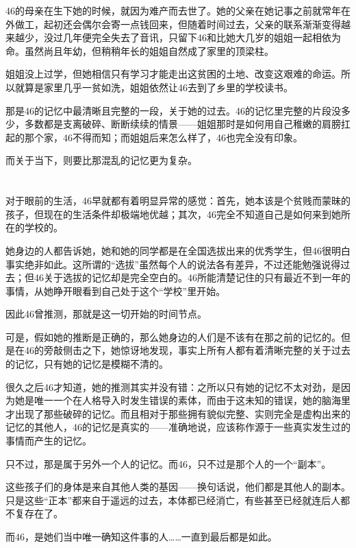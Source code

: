 46的母亲在生下她的时候，就因为难产而去世了。她的父亲在她记事之前就常年在外做工，起初还会偶尔会寄一点钱回来，但随着时间过去，父亲的联系渐渐变得越来越少，没过几年便完全失去了音讯，只留下46和比她大几岁的姐姐一起相依为命。虽然尚且年幼，但稍稍年长的姐姐自然成了家里的顶梁柱。

姐姐没上过学，但她相信只有学习才能走出这贫困的土地、改变这艰难的命运。所以就算是家里几乎一贫如洗，姐姐依然让46去到了乡里的学校读书。

那是46的记忆中最清晰且完整的一段，关于她的过去。46的记忆里完整的片段没多少，多数都是支离破碎、断断续续的情景——姐姐那时是如何用自己稚嫩的肩膀扛起的那个家，46不得而知；而姐姐后来怎么样了，46也完全没有印象。

而关于当下，则要比那混乱的记忆更为复杂。

\section*{}

对于眼前的生活，46早就都有着明显异常的感觉：首先，她本该是个贫贱而蒙昧的孩子，但现在的生活条件却极端地优越；其次，46完全不知道自己是如何来到她所在的学校的。

她身边的人都告诉她，她和她的同学都是在全国选拔出来的优秀学生，但46很明白事实绝非如此。这所谓的“选拔”虽然每个人的说法各有差异，不过还能勉强说得过去；但46关于选拔的记忆却是完全空白的。46所能清楚记住的只有最近不到一年的事情，从她睁开眼看到自己处于这个“学校”里开始。

因此46曾推测，那就是这一切开始的时间节点。

可是，假如她的推断是正确的，那么她身边的人们是不该有在那之前的记忆的。但是在46的旁敲侧击之下，她惊讶地发现，事实上所有人都有着清晰完整的关于过去的记忆，只有她的记忆是模糊不清的。

很久之后46才知道，她的推测其实并没有错：之所以只有她的记忆不太对劲，是因为她是唯一一个在人格导入时发生错误的素体，而由于这未知的错误，她的脑海里才出现了那些破碎的记忆。而且相对于那些拥有貌似完整、实则完全是虚构出来的记忆的其他人，46的记忆是真实的——准确地说，应该称作源于一些真实发生过的事情而产生的记忆。

只不过，那是属于另外一个人的记忆。而46，只不过是那个人的一个“副本”。

这些孩子们的身体是来自其他人类的基因——换句话说，他们都是其他人的副本。只是这些“正本”都来自于遥远的过去，本体都已经消亡，有些甚至已经就连后人都不复存在了。

而46，是她们当中唯一确知这件事的人……一直到最后都是如此。

\section*{}

